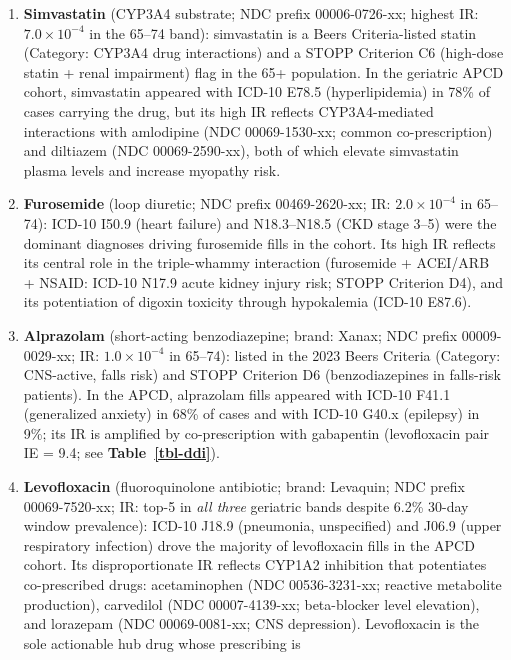 \documentclass[
  12pt,
]{book}
\begin{document}
\begin{enumerate}
\def\labelenumi{\arabic{enumi}.}
\item
  \textbf{Simvastatin} (CYP3A4 substrate; NDC prefix 00006-0726-xx;
  highest IR: \(7.0 \times 10^{-4}\) in the 65--74 band): simvastatin is
  a Beers Criteria-listed statin (Category: CYP3A4 drug interactions)
  and a STOPP Criterion C6 (high-dose statin + renal impairment) flag in
  the 65+ population. In the geriatric APCD cohort, simvastatin appeared
  with ICD-10 E78.5 (hyperlipidemia) in 78\% of cases carrying the drug,
  but its high IR reflects CYP3A4-mediated interactions with amlodipine
  (NDC 00069-1530-xx; common co-prescription) and diltiazem (NDC
  00069-2590-xx), both of which elevate simvastatin plasma levels and
  increase myopathy risk.
\item
  \textbf{Furosemide} (loop diuretic; NDC prefix 00469-2620-xx; IR:
  \(2.0 \times 10^{-4}\) in 65--74): ICD-10 I50.9 (heart failure) and
  N18.3--N18.5 (CKD stage 3--5) were the dominant diagnoses driving
  furosemide fills in the cohort. Its high IR reflects its central role
  in the triple-whammy interaction (furosemide + ACEI/ARB + NSAID:
  ICD-10 N17.9 acute kidney injury risk; STOPP Criterion D4), and its
  potentiation of digoxin toxicity through hypokalemia (ICD-10 E87.6).
\item
  \textbf{Alprazolam} (short-acting benzodiazepine; brand: Xanax; NDC
  prefix 00009-0029-xx; IR: \(1.0 \times 10^{-4}\) in 65--74): listed in
  the 2023 Beers Criteria (Category: CNS-active, falls risk) and STOPP
  Criterion D6 (benzodiazepines in falls-risk patients). In the APCD,
  alprazolam fills appeared with ICD-10 F41.1 (generalized anxiety) in
  68\% of cases and with ICD-10 G40.x (epilepsy) in 9\%; its IR is
  amplified by co-prescription with gabapentin (levofloxacin pair IE =
  9.4; see \textbf{Table~\ref{tbl-ddi}}).
\item
  \textbf{Levofloxacin} (fluoroquinolone antibiotic; brand: Levaquin;
  NDC prefix 00069-7520-xx; IR: top-5 in \emph{all three} geriatric
  bands despite 6.2\% 30-day window prevalence): ICD-10 J18.9
  (pneumonia, unspecified) and J06.9 (upper respiratory infection) drove
  the majority of levofloxacin fills in the APCD cohort. Its
  disproportionate IR reflects CYP1A2 inhibition that potentiates
  co-prescribed drugs: acetaminophen (NDC 00536-3231-xx; reactive
  metabolite production), carvedilol (NDC 00007-4139-xx; beta-blocker
  level elevation), and lorazepam (NDC 00069-0081-xx; CNS depression).
  Levofloxacin is the sole actionable hub drug whose prescribing is

\end{enumerate}
\end{document}
